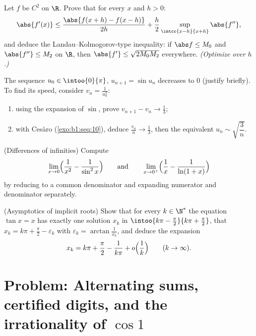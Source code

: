 \begin{exercise}[$\star\star\star$]\label{exo:b1:taylor:9}
Let $f$ be $C^2$ on $\R$. Prove that for every $x$ and $h > 0$:
\[
\abs{f'(x)} \leq \frac{\abs{f(x+h) - f(x-h)}}{2h} +
\frac{h}{2}\sup_{\intcc{x-h}{x+h}}\abs{f''} ,
\]
and deduce the Landau--Kolmogorov-type inequality: if $\abs f \leq
M_0$ and $\abs{f''} \leq M_2$ on $\R$, then $\abs{f'} \leq
\sqrt{2 M_0 M_2}$ everywhere. \emph{(Optimize over $h$.)}
\end{exercise}

\begin{exercise}[$\star\star\star$]\label{exo:b1:taylor:10}
The sequence $u_0 \in \intoo{0}{\pi}$, $u_{n+1} = \sin u_n$
decreases to $0$ (justify briefly). To find its speed, consider $v_n
= \frac{1}{u_n^2}$:
\begin{enumerate}
  \item using the expansion of $\sin$, prove $v_{n+1} - v_n \to
        \frac13$;
  \item with Ces\`aro (\cref{exo:b1:seq:10}), deduce $\frac{v_n}{n}
        \to \frac13$, then the equivalent $u_n \sim
        \sqrt{\dfrac{3}{n}}$.
\end{enumerate}
\end{exercise}

\begin{exercise}[$\star\star$]\label{exo:b1:taylor:11}
(Differences of infinities) Compute
\[
\lim_{x \to 0} \Bigl(\frac{1}{x^2} - \frac{1}{\sin^2 x}\Bigr)
\qquad\text{and}\qquad
\lim_{x \to 0^+} \Bigl(\frac 1x - \frac{1}{\ln(1 + x)}\Bigr)
\]
by reducing to a common denominator and expanding numerator and
denominator separately.
\end{exercise}

\begin{exercise}[$\star\star\star$]\label{exo:b1:taylor:12}
(Asymptotics of implicit roots) Show that for every $k \in
\N^*$ the equation $\tan x = x$ has exactly one solution $x_k$
in $\intoo{k\pi - \frac\pi2}{k\pi + \frac\pi2}$, that $x_k = k\pi
+ \frac\pi2 - \varepsilon_k$ with $\varepsilon_k =
\arctan\frac{1}{x_k}$, and deduce the expansion
\[
x_k = k\pi + \frac\pi2 - \frac{1}{k\pi} + o\Bigl(\frac
1k\Bigr) \qquad (k \to \infty).
\]
\end{exercise}

\section{Problem: Alternating sums, certified digits, and the
irrationality of $\cos 1$}

